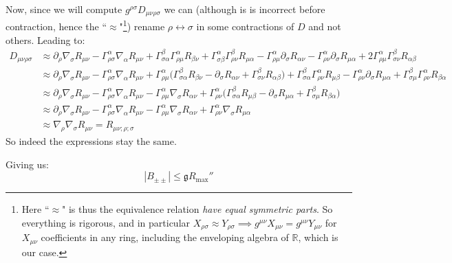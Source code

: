 \documentclass[a4paper,11pt]{article}
\numberwithin{equation}{section}
\theoremstyle{definition}
\begin{document}
Now, since we will compute $g^{\rho\sigma}D_{\mu\nu\rho\sigma}$ we can (although is is incorrect before contraction, hence the ``$\approx$"\footnote{Here ``$\approx$" is thus the equivalence relation \textit{have equal symmetric parts}. So everything is rigorous, and in particular $X_{\rho\sigma} \approx Y_{\rho\sigma} \implies g^{\mu\nu}X_{\mu\nu}=g^{\mu\nu}Y_{\mu\nu}$ for $X_{\mu\nu}$ coefficients in any ring, including the enveloping algebra of $\mathbb{R}$, which is our case.})  rename $\rho \leftrightarrow \sigma$ in some contractions of $D$ and not others. Leading to:
\begin{align*}
    D_{\mu\nu\rho\sigma} 
    &\approx\partial_\rho \nabla_\sigma R_{\mu\nu}
    - \Gamma_{\rho\sigma}^\alpha \nabla_\alpha R_{\mu\nu}
    + \Gamma_{\sigma\alpha}^\beta \Gamma_{\rho\mu}^\alpha R_{\beta\nu}
    + \Gamma_{\sigma\beta}^\alpha \Gamma_{\rho\nu}^\beta R_{\mu\alpha}
    - \Gamma_{\rho\mu}^\alpha \partial_\sigma R_{\alpha\nu}
    - \Gamma_{\rho\nu}^\alpha \partial_\sigma R_{\mu\alpha}
    + 2 \Gamma_{\rho\mu}^\alpha \Gamma_{\sigma\nu}^\beta R_{\alpha\beta}\\
    &\approx\partial_\rho \nabla_\sigma R_{\mu\nu}
    - \Gamma_{\rho\sigma}^\alpha \nabla_\alpha R_{\mu\nu}
    + \Gamma_{\rho\mu}^\alpha \Big(
      \Gamma_{\sigma\alpha}^\beta  R_{\beta\nu}
    - \partial_\sigma R_{\alpha\nu}
    + \Gamma_{\sigma\nu}^\beta R_{\alpha\beta}
    \Big)
    + \Gamma_{\sigma\alpha}^\beta \Gamma_{\rho\nu}^\alpha R_{\mu\beta}
    - \Gamma_{\rho\nu}^\alpha \partial_\sigma R_{\mu\alpha}
    + \Gamma_{\sigma\mu}^\beta \Gamma_{\rho\nu}^\alpha R_{\beta\alpha}\\
    &\approx\partial_\rho \nabla_\sigma R_{\mu\nu}
    - \Gamma_{\rho\sigma}^\alpha \nabla_\alpha R_{\mu\nu}
    - \Gamma_{\rho\mu}^\alpha \nabla_\sigma R_{\alpha \nu}
    + \Gamma_{\rho\nu}^\alpha \Big( \Gamma_{\sigma\alpha}^\beta  R_{\mu\beta}
    - \partial_\sigma R_{\mu\alpha}
    + \Gamma_{\sigma\mu}^\beta R_{\beta\alpha} \Big)\\
    &\approx\partial_\rho \nabla_\sigma R_{\mu\nu}
    - \Gamma_{\rho\sigma}^\alpha \nabla_\alpha R_{\mu\nu}
    - \Gamma_{\rho\mu}^\alpha \nabla_\sigma R_{\alpha \nu}
    + \Gamma_{\rho\nu}^\alpha \nabla_\sigma R_{\mu\alpha}\\
    &\approx \nabla_\rho \nabla_\sigma R_{\mu\nu} = R_{\mu\nu;\rho;\sigma}
\end{align*}
So indeed the expressions stay the same.

Giving us:
$$|B_{\pm\pm}|  \leq \mathfrak{g} R_\mathrm{max}''$$
\end{document}

